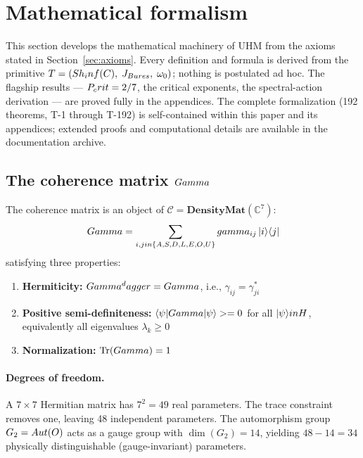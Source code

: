 
\section{Mathematical formalism}
\label{sec:formalism}

This section develops the mathematical machinery of UHM from the axioms
stated in Section~\ref{sec:axioms}. Every definition and formula is derived
from the primitive $T = (Sh_inf(C),\; J_{Bures},\; \omega_0)$;
nothing is postulated ad hoc. The flagship results — $P_crit = 2/7$, the
critical exponents, the spectral-action derivation — are proved fully in the
appendices. The complete formalization (192 theorems, T-1 through T-192)
is self-contained within this paper and its appendices; extended proofs
and computational details are available in the documentation archive.

\subsection{The coherence matrix $Gamma$}
\label{subsec:gamma}

\begin{definition}
The coherence matrix is an object of $\mathcal{C} = \mathbf{DensityMat}(\mathbb{C}^7)$:
\begin{equation}
  Gamma = \sum_{i,j in \{A,S,D,L,E,O,U\}} gamma_{ij}\, |i\rangle\langle j|
  \label{eq:gamma-def}
\end{equation}
satisfying three properties:
\begin{enumerate}[leftmargin=2em]
  \item \textbf{Hermiticity:} $Gamma^dagger = Gamma$, i.e., $\gamma_{ij} = \gamma_{ji}^*$
  \item \textbf{Positive semi-definiteness:} $\langle\psi|Gamma|\psi\rangle >= 0$
        for all $|\psi\rangle in H$, equivalently all eigenvalues $\lambda_k \geq 0$
  \item \textbf{Normalization:} $\Tr(Gamma) = 1$
\end{enumerate}
\end{definition}

\paragraph{Degrees of freedom.}
A $7 \times 7$ Hermitian matrix has $7^2 = 49$ real parameters. The trace constraint
removes one, leaving 48 independent parameters. The automorphism group $G_2 = Aut(O)$
acts as a gauge group with $\dim(G_2) = 14$, yielding $48 - 14 = 34$ physically
distinguishable (gauge-invariant) parameters.

